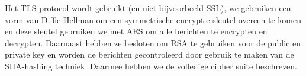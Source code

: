 Het TLS protocol wordt gebruikt (en niet bijvoorbeeld SSL), we gebruiken een vorm van Diffie-Hellman om een symmetrische encryptie sleutel overeen te komen en deze sleutel gebruiken we met AES om alle berichten te encrypten en decrypten. Daarnaast hebben ze besloten om RSA te gebruiken voor de public en private key en worden de berichten gecontroleerd door gebruik te maken van de SHA-hashing techniek. Daarmee hebben we de volledige cipher suite beschreven.
